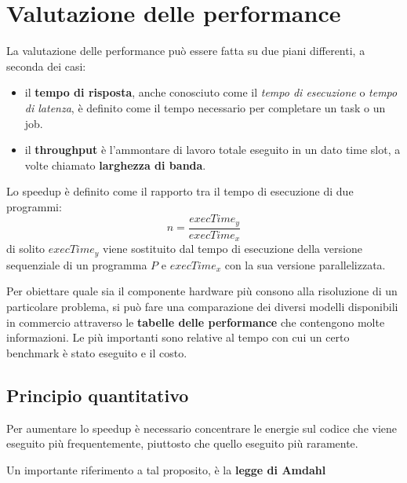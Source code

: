 \section{Valutazione delle performance}
La valutazione delle performance può essere fatta su due piani differenti, a seconda dei casi:
\begin{itemize}
    \item il \textbf{tempo di risposta}, anche conosciuto come il \emph{tempo di esecuzione} o \emph{tempo di latenza}, è definito come il tempo necessario per completare un task o un job.

\item il \textbf{throughput} è l'ammontare di lavoro totale eseguito in un dato time slot, a volte chiamato \textbf{larghezza di banda}.
\end{itemize}

Lo speedup è definito come il rapporto tra il tempo di esecuzione di due programmi:
\begin{equation*}
	n=\frac{execTime_y}{execTime_x}
\end{equation*}
di solito $execTime_y$ viene sostituito dal tempo di esecuzione della versione sequenziale di un programma $P$ e $execTime_x$ con la sua versione parallelizzata.


Per obiettare quale sia il componente hardware più consono alla risoluzione di un particolare problema, si può fare una comparazione dei diversi modelli disponibili in commercio attraverso le \textbf{tabelle delle performance} che contengono molte informazioni. Le più importanti sono relative al tempo con cui un certo benchmark è stato eseguito e il costo.

\subsection{Principio quantitativo} Per aumentare lo speedup è necessario concentrare le energie sul codice che viene eseguito più frequentemente, piuttosto che quello eseguito più raramente.

Un importante riferimento a tal proposito, è la \textbf{legge di Amdahl}
